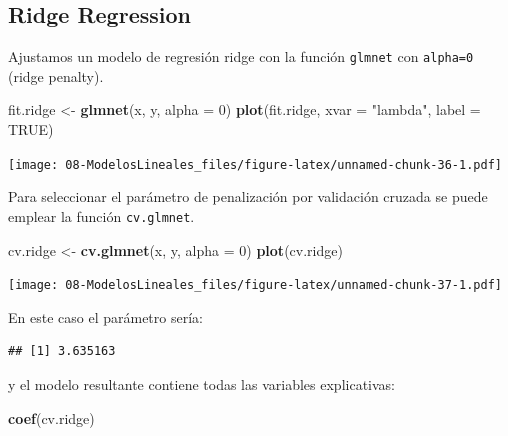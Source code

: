 \documentclass[]{book}
\newenvironment{Shaded}{\begin{snugshade}}{\end{snugshade}}
\newcommand{\KeywordTok}[1]{\textcolor[rgb]{0.13,0.29,0.53}{\textbf{#1}}}
\newcommand{\DataTypeTok}[1]{\textcolor[rgb]{0.13,0.29,0.53}{#1}}
\newcommand{\DecValTok}[1]{\textcolor[rgb]{0.00,0.00,0.81}{#1}}
\newcommand{\StringTok}[1]{\textcolor[rgb]{0.31,0.60,0.02}{#1}}
\newcommand{\OtherTok}[1]{\textcolor[rgb]{0.56,0.35,0.01}{#1}}
\newcommand{\OperatorTok}[1]{\textcolor[rgb]{0.81,0.36,0.00}{\textbf{#1}}}
\newcommand{\NormalTok}[1]{#1}
\begin{document}
\subsection{Ridge Regression}\label{ridge-regression}

Ajustamos un modelo de regresión ridge con la función \texttt{glmnet}
con \texttt{alpha=0} (ridge penalty).

\begin{Shaded}
\begin{Highlighting}[]
\NormalTok{fit.ridge <-}\StringTok{ }\KeywordTok{glmnet}\NormalTok{(x, y, }\DataTypeTok{alpha =} \DecValTok{0}\NormalTok{)}
\KeywordTok{plot}\NormalTok{(fit.ridge, }\DataTypeTok{xvar =} \StringTok{"lambda"}\NormalTok{, }\DataTypeTok{label =} \OtherTok{TRUE}\NormalTok{)}
\end{Highlighting}
\end{Shaded}

\texttt{[image: 08-ModelosLineales\_files/figure-latex/unnamed-chunk-36-1.pdf]}

Para seleccionar el parámetro de penalización por validación cruzada se
puede emplear la función \texttt{cv.glmnet}.

\begin{Shaded}
\begin{Highlighting}[]
\NormalTok{cv.ridge <-}\StringTok{ }\KeywordTok{cv.glmnet}\NormalTok{(x, y, }\DataTypeTok{alpha =} \DecValTok{0}\NormalTok{)}
\KeywordTok{plot}\NormalTok{(cv.ridge)}
\end{Highlighting}
\end{Shaded}

\texttt{[image: 08-ModelosLineales\_files/figure-latex/unnamed-chunk-37-1.pdf]}

En este caso el parámetro sería:

\begin{Shaded}
\end{Shaded}

\begin{verbatim}
## [1] 3.635163
\end{verbatim}

y el modelo resultante contiene todas las variables explicativas:

\begin{Shaded}
\begin{Highlighting}[]
\KeywordTok{coef}\NormalTok{(cv.ridge)}
\end{Highlighting}
\end{Shaded}
\end{document}
